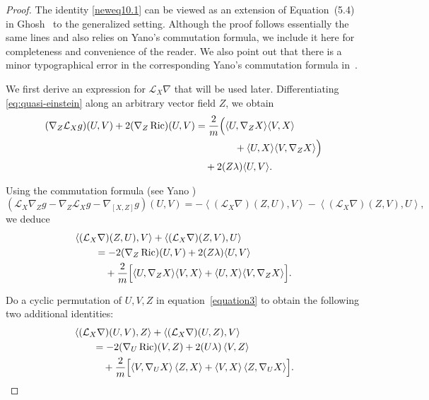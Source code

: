 \documentclass[a4paper, 12pt]{amsart}
\newcommand{\inner}[2]{\left\langle #1,#2\right\rangle}
\theoremstyle{definition}
\numberwithin{figure}{section}
\begin{document}
\begin{proof} The identity \eqref{neweq10.1} can be viewed as an extension of Equation~(5.4) in Ghosh~\cite{ghosh} to the generalized setting. Although the proof follows essentially the same lines and also relies on Yano's commutation formula, we include it here for completeness and convenience of the reader. We also point out that there is a minor typographical error in the corresponding Yano's commutation formula in~\cite{ghosh}.

We first derive an expression for $\mathcal{L}_X\nabla$ that will be used later. Differentiating \eqref{eq:quasi-einstein} along an arbitrary vector field $Z$, we obtain
\begin{align}
(\nabla_Z\mathcal{L}_Xg)(U,V)
+2(\nabla_Z\operatorname{Ric})(U,V)
&=
\frac{2}{m}\Bigl(
\langle U,\nabla_ZX\rangle \langle V,X\rangle
\notag\\
&\qquad\qquad
+\langle U,X\rangle \langle V,\nabla_ZX\rangle
\Bigr)
\notag\\
&\quad
+2(Z\lambda)\langle U,V\rangle .
\end{align}

Using the commutation formula (see Yano \cite{Yan70})
\[
(\mathcal{L}_X\nabla_Z g-\nabla_Z\mathcal{L}_X g-\nabla_{[X,Z]}g)(U,V)
=
-\inner{(\mathcal{L}_X\nabla)(Z,U)}{V}
-\inner{(\mathcal{L}_X\nabla)(Z,V)}{U},
\]
we deduce
\begin{equation}\label{equation3}
\begin{aligned}
&
\langle (\mathcal{L}_X\nabla)(Z,U),V\rangle
+
\langle (\mathcal{L}_X\nabla)(Z,V),U\rangle
\\
&\qquad
=
-2(\nabla_Z\operatorname{Ric})(U,V)
+2(Z\lambda)\langle U,V\rangle
\\
&\qquad\quad
+\frac{2}{m}\Bigl[
\langle U,\nabla_ZX\rangle \langle V,X\rangle
+
\langle U,X\rangle \langle V,\nabla_ZX\rangle
\Bigr].
\end{aligned}
\end{equation}

Do a cyclic permutation of \(U,V,Z\) in equation~\eqref{equation3} to obtain the following two additional identities:
\begin{equation}\label{equation4}
\begin{split}
&
\left\langle (\mathcal{L}_X\nabla)(U,V),Z \right\rangle
+
\left\langle (\mathcal{L}_X\nabla)(U,Z),V \right\rangle
\\
&\qquad
=
-2(\nabla_U\operatorname{Ric})(V,Z)
+2(U\lambda)\left\langle V,Z \right\rangle
\\
&\qquad\quad
+\frac{2}{m}\Bigl[
\left\langle V,\nabla_UX \right\rangle
\left\langle Z,X \right\rangle
+
\left\langle V,X \right\rangle
\left\langle Z,\nabla_UX \right\rangle
\Bigr].
\end{split}
\end{equation}


\end{proof}
\end{document}
